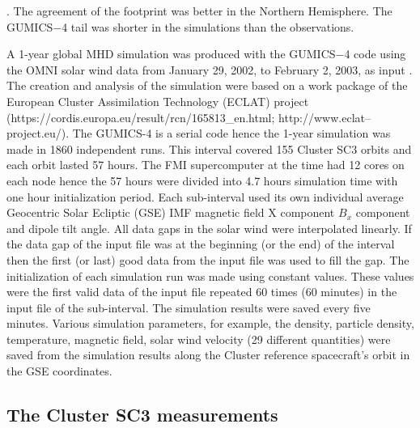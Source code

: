 \documentclass[draft]{agujournal2019}
\begin{document}
\cite{tsyganenko95:_model_earth}. The agreement of the footprint was better in the Northern Hemisphere. The GUMICS$-$4 tail was shorter in the simulations than the observations. 

A 1-year global MHD simulation was produced with the GUMICS$-$4 code using the OMNI solar wind data from January 29, 2002, to February 2, 2003, as input \cite{facsko16:_one_earth}. The creation and analysis of the simulation were based on a work package of the European Cluster Assimilation Technology (ECLAT) project (https://cordis.europa.eu/result/rcn/165813\_en.html; http://www.eclat--project.eu/). The GUMICS-4 is a serial code \cite{janhunen12:_gumic_mhd} hence the 1-year simulation was made in 1860 independent runs. This interval covered 155 Cluster SC3 orbits and each orbit lasted 57 hours. The FMI supercomputer at the time had 12 cores on each node hence the 57 hours were divided into 4.7 hours simulation time with one hour initialization period. Each sub-interval used its own individual average Geocentric Solar Ecliptic (GSE) IMF magnetic field X component $B_x$ component and dipole tilt angle. All data gaps in the solar wind were interpolated linearly. If the data gap of the input file was at the beginning (or the end) of the interval then the first (or last) good data from the input file was used to fill the gap. The initialization of each simulation run was made using constant values. These values were the first valid data of the input file repeated 60 times (60 minutes) in the input file of the sub-interval. The simulation results were saved every five minutes. Various simulation parameters, for example, the density, particle density, temperature, magnetic field, solar wind velocity (29 different quantities) were saved from the simulation results along the Cluster reference spacecraft's orbit in the GSE coordinates. 

\subsection{The Cluster SC3 measurements}
\label{sec:cluster}
\end{document}
